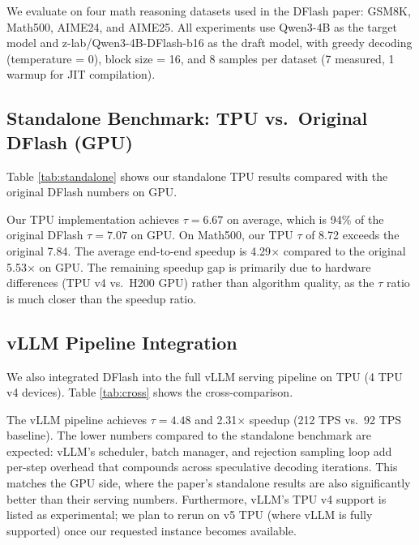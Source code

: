 \documentclass[12pt,letterpaper]{article}
\begin{document}
We evaluate on four math reasoning datasets used in the DFlash paper: GSM8K, Math500, AIME24, and AIME25. All experiments use Qwen3-4B as the target model and z-lab/Qwen3-4B-DFlash-b16 as the draft model, with greedy decoding (temperature = 0), block size = 16, and 8 samples per dataset (7 measured, 1 warmup for JIT compilation).

\subsection{Standalone Benchmark: TPU vs.\ Original DFlash (GPU)}

Table \ref{tab:standalone} shows our standalone TPU results compared with the original DFlash numbers on GPU.

\begin{table}[htbp]
\caption{Standalone benchmark results: TPU (single v4 device, JAX) vs.\ original DFlash on GPU (H200, PyTorch). $\tau$ = average acceptance length, Speedup = wall-clock ratio over autoregressive baseline, TPS = tokens per second.}
\label{tab:standalone}
\resizebox{\linewidth}{!}{}
\end{table}

Our TPU implementation achieves $\tau=6.67$ on average, which is 94\% of the original DFlash $\tau=7.07$ on GPU. On Math500, our TPU $\tau$ of 8.72 exceeds the original 7.84. The average end-to-end speedup is 4.29$\times$ compared to the original 5.53$\times$ on GPU. The remaining speedup gap is primarily due to hardware differences (TPU v4 vs.\ H200 GPU) rather than algorithm quality, as the $\tau$ ratio is much closer than the speedup ratio.

\subsection{vLLM Pipeline Integration}

We also integrated DFlash into the full vLLM serving pipeline on TPU (4 TPU v4 devices). Table \ref{tab:cross} shows the cross-comparison.

\begin{table}[htbp]
\caption{Cross-comparison: standalone TPU, vLLM pipeline TPU, and original DFlash (GPU). The vLLM pipeline shows lower speedup due to scheduling and batch management overhead, not algorithm quality.}
\label{tab:cross}
\resizebox{\linewidth}{!}{}
\end{table}

The vLLM pipeline achieves $\tau=4.48$ and 2.31$\times$ speedup (212 TPS vs.\ 92 TPS baseline). The lower numbers compared to the standalone benchmark are expected: vLLM's scheduler, batch manager, and rejection sampling loop add per-step overhead that compounds across speculative decoding iterations. This matches the GPU side, where the paper's standalone results are also significantly better than their serving numbers. Furthermore, vLLM's TPU v4 support is listed as experimental; we plan to rerun on v5 TPU (where vLLM is fully supported) once our requested instance becomes available.
\end{document}
